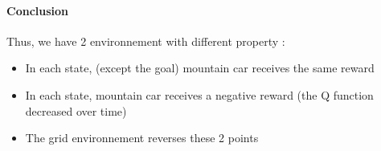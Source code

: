 \documentclass[a4paper,12pt]{article}
\begin{document}
      \paragraph{Conclusion}
      Thus, we have 2 environnement with different property :
      \begin{itemize}
       \item In each state, (except the goal) mountain car receives the same reward
       \item In each state, mountain car receives a negative reward (the Q function decreased over time)
       \item The grid environnement reverses these 2 points
      \end{itemize}

    
% 
%      
% 
%     
%     
%      
%       
%       
\end{document}
